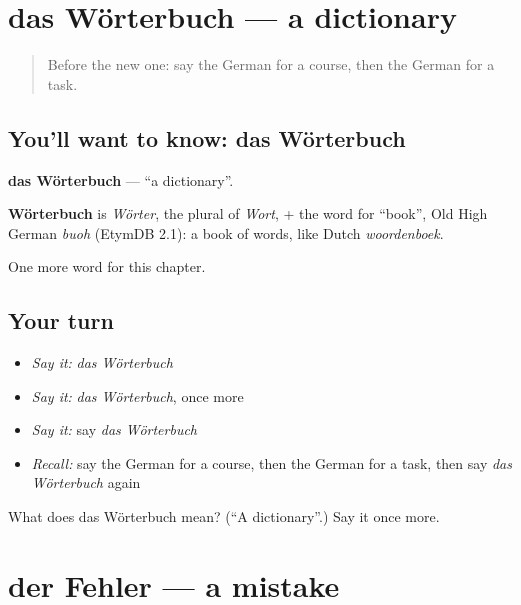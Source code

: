 \section[das Wörterbuch]{das Wörterbuch — a dictionary}

\label{lesson:GE-C160-woerterbuch}



\begin{quote}
Before the new one: say the German for a course, then the German for a task.
\end{quote}

\subsection*{You'll want to know: das Wörterbuch}
\textbf{das Wörterbuch} — \textquotedblleft{}a dictionary\textquotedblright{}.

\begin{cousinweb}
\textbf{Wörterbuch} is \emph{Wörter}, the plural of \emph{Wort}, + the word for \textquotedblleft{}book\textquotedblright{}, Old High German \emph{buoh} (EtymDB 2.1): a book of words, like Dutch \emph{woordenboek}.
\end{cousinweb}

\begin{grammarlens}[title={What you've built}]
One more word for this chapter.
\end{grammarlens}

\subsection*{Your turn}
\begin{itemize}
\raggedright
  \item \emph{Say it:} \emph{das Wörterbuch}
  \item \emph{Say it:} \emph{das Wörterbuch}, once more
  \item \emph{Say it:} say \emph{das Wörterbuch}
  \item \emph{Recall:} say the German for a course, then the German for a task, then say \emph{das Wörterbuch} again
\end{itemize}

\begin{tcolorbox}[breakable,colback=teal!4,colframe=teal!35!black,title={Before you move on}]
What does das Wörterbuch mean? (\textquotedblleft{}A dictionary\textquotedblright{}.) Say it once more.
\end{tcolorbox}
\section[der Fehler]{der Fehler — a mistake}

